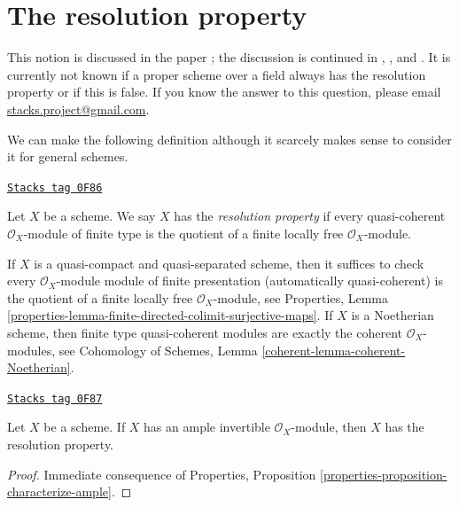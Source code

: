 \section{The resolution property}
\label{perfect-section-resolution-property}
This notion is discussed in the paper \cite{totaro_resolution};
the discussion is continued in \cite{Gross-thesis},
\cite{Gross-surface}, and \cite{Gross-stack}.
It is currently not known if a proper scheme over a field
always has the resolution property or if this is false.
If you know the answer to this question, please email
\href{mailto:stacks.project@gmail.com}{stacks.project@gmail.com}.

\medskip\noindent
We can make the following definition although it scarcely makes
sense to consider it for general schemes.

\begin{definition}
\label{perfect-definition-resolution-property}
\href{https://stacks.math.columbia.edu/tag/0F86}{\texttt{Stacks tag 0F86}}

Let $X$ be a scheme. We say $X$ has the {\it resolution property}
if every quasi-coherent $\mathcal{O}_X$-module of finite type
is the quotient of a finite locally free $\mathcal{O}_X$-module.
\end{definition}

If $X$ is a quasi-compact and quasi-separated scheme, then it suffices to check
every $\mathcal{O}_X$-module module of finite presentation (automatically
quasi-coherent) is the quotient of a finite locally free
$\mathcal{O}_X$-module, see Properties, Lemma
\ref{properties-lemma-finite-directed-colimit-surjective-maps}.
If $X$ is a Noetherian scheme, then finite type quasi-coherent modules
are exactly the coherent $\mathcal{O}_X$-modules, see
Cohomology of Schemes, Lemma \ref{coherent-lemma-coherent-Noetherian}.

\begin{lemma}
\label{perfect-lemma-resolution-property-ample}
\href{https://stacks.math.columbia.edu/tag/0F87}{\texttt{Stacks tag 0F87}}

Let $X$ be a scheme. If $X$ has an ample invertible $\mathcal{O}_X$-module,
then $X$ has the resolution property.
\end{lemma}

\begin{proof}
Immediate consequence of Properties, Proposition
\ref{properties-proposition-characterize-ample}.
\end{proof}

